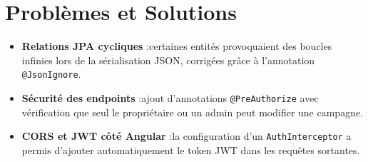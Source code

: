 \section{Problèmes et Solutions}
\begin{itemize}[label=\textbullet]
    \item \textbf{Relations JPA cycliques} :\newline certaines entités provoquaient des boucles infinies lors de la sérialisation JSON,
    corrigées grâce à l’annotation \texttt{@JsonIgnore}.

    \item \textbf{Sécurité des endpoints} :\newline ajout d’annotations \texttt{@PreAuthorize} avec vérification que seul le propriétaire ou un admin peut modifier une campagne.
    \item \textbf{CORS et JWT côté Angular} :\newline la configuration d’un \texttt{AuthInterceptor} a permis d’ajouter automatiquement le token JWT dans les requêtes sortantes.

\end{itemize}

